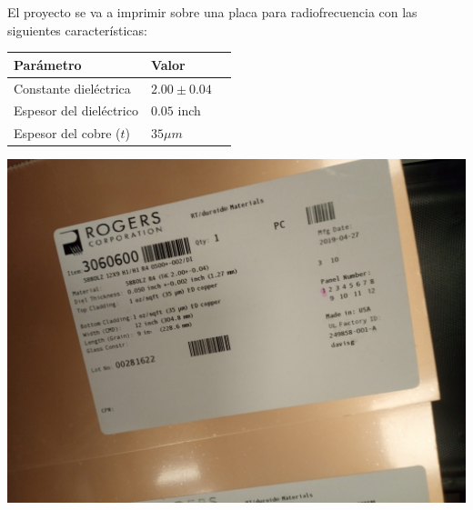 \documentclass[a4paper, 12pt]{article}
\begin{document}
\begin{minipage}{0.66\linewidth}
  El proyecto se va a imprimir sobre una placa para radiofrecuencia \cite{RT-DUROID}con las siguientes características:
  \begin{tabular}{|l|l|l|}
  \hline
  Parámetro & Valor & \\ \hline
  Constante dieléctrica & $2.00 \pm 0.04$ & \\ \hline
  Espesor del dieléctrico & $0.05$ inch & \\ \hline
  Espesor del cobre ($t$) & $35 \mu m$ & \\ \hline
  \end{tabular}
\end{minipage}
\begin{minipage}{0.32\linewidth}
  \includegraphics[width=\linewidth]{./img/sustrato.jpg}
\end{minipage}
\end{document}
